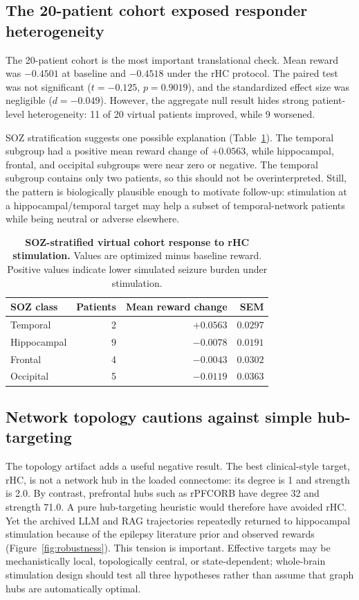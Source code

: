 \documentclass{article}
\begin{document}
\subsection{The 20-patient cohort exposed responder heterogeneity}
The 20-patient cohort is the most important translational check. Mean reward was $-0.4501$ at baseline and $-0.4518$ under the rHC protocol. The paired test was not significant ($t=-0.125$, $p=0.9019$), and the standardized effect size was negligible ($d=-0.049$). However, the aggregate null result hides strong patient-level heterogeneity: 11 of 20 virtual patients improved, while 9 worsened.

SOZ stratification suggests one possible explanation (Table~\ref{tab:soz}). The temporal subgroup had a positive mean reward change of $+0.0563$, while hippocampal, frontal, and occipital subgroups were near zero or negative. The temporal subgroup contains only two patients, so this should not be overinterpreted. Still, the pattern is biologically plausible enough to motivate follow-up: stimulation at a hippocampal/temporal target may help a subset of temporal-network patients while being neutral or adverse elsewhere.

\begin{table}[t]
  \centering
  \caption{\textbf{SOZ-stratified virtual cohort response to rHC stimulation.} Values are optimized minus baseline reward. Positive values indicate lower simulated seizure burden under stimulation.}
  \label{tab:soz}
  \begin{tabular}{lrrr}
    \toprule
    SOZ class & Patients & Mean reward change & SEM \\
    \midrule
    Temporal & 2 & $+0.0563$ & $0.0297$ \\
    Hippocampal & 9 & $-0.0078$ & $0.0191$ \\
    Frontal & 4 & $-0.0043$ & $0.0302$ \\
    Occipital & 5 & $-0.0119$ & $0.0363$ \\
    \bottomrule
  \end{tabular}
\end{table}

\subsection{Network topology cautions against simple hub-targeting}
The topology artifact adds a useful negative result. The best clinical-style target, rHC, is not a network hub in the loaded connectome: its degree is 1 and strength is 2.0. By contrast, prefrontal hubs such as rPFCORB have degree 32 and strength 71.0. A pure hub-targeting heuristic would therefore have avoided rHC. Yet the archived LLM and RAG trajectories repeatedly returned to hippocampal stimulation because of the epilepsy literature prior and observed rewards (Figure~\ref{fig:robustness}). This tension is important. Effective targets may be mechanistically local, topologically central, or state-dependent; whole-brain stimulation design should test all three hypotheses rather than assume that graph hubs are automatically optimal.
\end{document}
